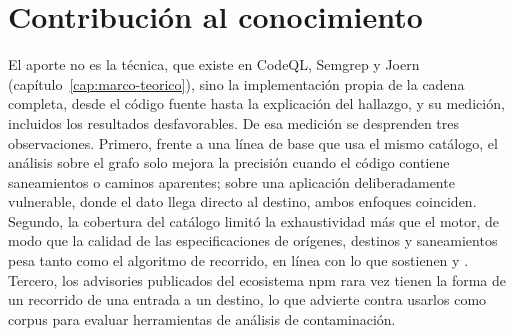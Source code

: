 \section{Contribución al conocimiento}\label{sec:contribucion}

El aporte no es la técnica, que existe en CodeQL, Semgrep y Joern
(capítulo~\ref{cap:marco-teorico}), sino la implementación propia de la
cadena completa, desde el código fuente hasta la explicación del
hallazgo, y su medición, incluidos los resultados desfavorables. De esa
medición se desprenden tres observaciones. Primero, frente a una línea de
base que usa el mismo catálogo, el análisis sobre el grafo solo mejora la
precisión cuando el código contiene saneamientos o caminos aparentes;
sobre una aplicación deliberadamente vulnerable, donde el dato llega
directo al destino, ambos enfoques coinciden. Segundo, la cobertura del
catálogo limitó la exhaustividad más que el motor, de modo que la
calidad de las especificaciones de orígenes, destinos y saneamientos
pesa tanto como el algoritmo de recorrido, en línea con lo que sostienen
\citet{dutta2022} y \citet{balbi2023}. Tercero, los advisories
publicados del ecosistema npm rara vez tienen la forma de un recorrido
de una entrada a un destino, lo que advierte contra usarlos como corpus
para evaluar herramientas de análisis de contaminación.
